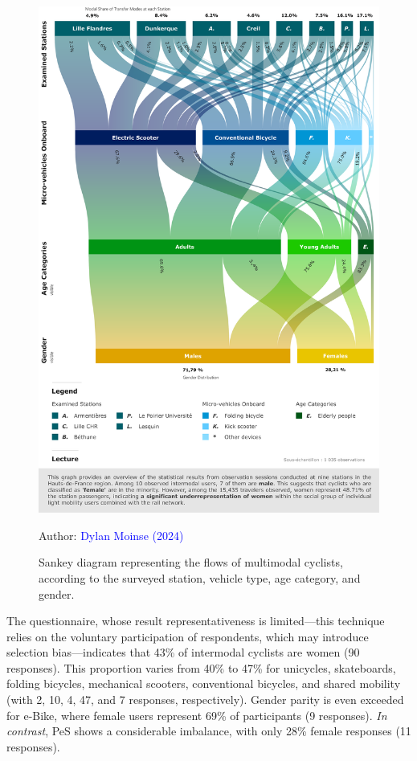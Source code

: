 \begin{refsegment}
\begin{figure}[h!]\vspace*{4pt}
    \caption{Sankey diagram representing the flows of multimodal cyclists, according to the surveyed station, vehicle type, age category, and gender.}
    \label{fig-chap4:genre-age}
    \centerline{\includegraphics[width=1\columnwidth]{src/Figures/Chap-4/EN_Genre_Age.pdf}}
    \vspace{5pt}
    \begin{flushright}\scriptsize{
    Author: \textcolor{blue}{Dylan Moinse (2024)}
    }\end{flushright}
\end{figure}

The questionnaire, whose result representativeness is limited—this technique relies on the voluntary participation of respondents, which may introduce selection bias—indicates that 43\% of intermodal cyclists are women (90 responses). This proportion varies from 40\% to 47\% for unicycles, skateboards, folding bicycles, mechanical scooters, conventional bicycles, and shared mobility (with 2, 10, 4, 47, and 7 responses, respectively). Gender parity is even exceeded for \acrshort{e-Bike}, where female users represent 69\% of participants (9 responses). \textsl{In contrast}, \acrshort{PeS} shows a considerable imbalance, with only 28\% female responses (11 responses). %


\end{refsegment}
